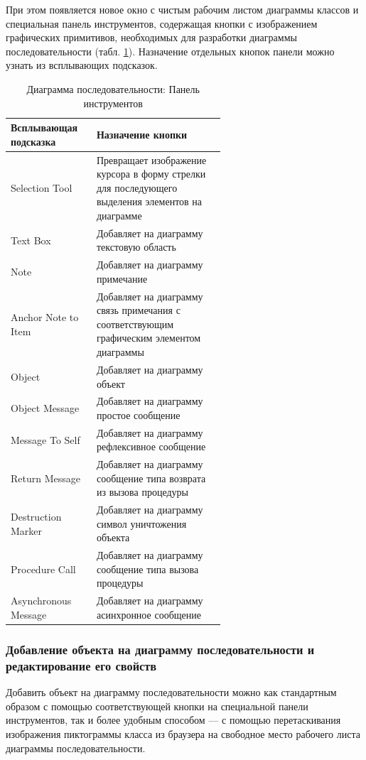 \documentclass[a4paper,12pt]{report}
\begin{document}
При этом появляется новое окно с чистым рабочим листом диаграммы классов и специальная панель инструментов, содержащая кнопки с изображением графических примитивов, необходимых для разработки диаграммы последовательности (табл. \ref{tab:toolboxsequence}). Назначение отдельных кнопок панели можно узнать из всплывающих подсказок.

\begin{table}[h!]
	
	\begin{tabular}{|l|m{0.6\linewidth}|}
		\hline
		\textbf{Всплывающая подсказка}&\textbf{Назначение кнопки} \\ \hline
		Selection Tool&Превращает изображение курсора в форму стрелки для последующего выделения элементов на диаграмме \\ \hline
		Text Box& Добавляет на диаграмму текстовую область \\ \hline
		Note& Добавляет на диаграмму примечание \\ \hline
		Anchor Note to Item & Добавляет на диаграмму связь примечания с соответствующим графическим элементом диаграммы \\ \hline
		Object &Добавляет на диаграмму объект \\ \hline
		Object Message& Добавляет на диаграмму простое сообщение \\ \hline
		Message To Self&Добавляет на диаграмму рефлексивное сообщение \\ \hline
		Return Message&Добавляет на диаграмму сообщение типа возврата из вызова процедуры \\ \hline
		Destruction Marker&Добавляет на диаграмму символ уничтожения объекта \\ \hline
		Procedure Call&Добавляет на диаграмму сообщение типа вызова процедуры \\ \hline
		Asynchronous Message&Добавляет на диаграмму асинхронное сообщение  \\ \hline
	\end{tabular}
	\caption{Диаграмма последовательности: Панель инструментов}
	\label{tab:toolboxsequence}
\end{table}

\subsubsection*{Добавление объекта на диаграмму последовательности и редактирование его свойств}
Добавить объект на диаграмму последовательности можно как стандартным образом с помощью соответствующей кнопки на специальной панели инструментов, так и более удобным способом --- с помощью перетаскивания изображения пиктограммы класса из браузера на свободное место рабочего листа диаграммы последовательности.
\end{document}
